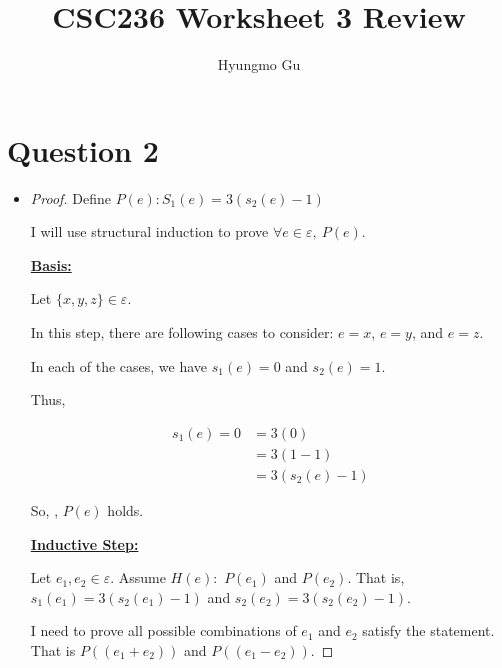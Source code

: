 \documentclass[12pt]{article}
\begin{document}
\title{CSC236 Worksheet 3 Review}
\author{Hyungmo Gu}
\maketitle

\section*{Question 2}
\begin{itemize}
    \item

    \begin{proof}
    Define $P(e):S_1(e) = 3(s_2(e) - 1)$

    \bigskip

    I will use structural induction to prove $\forall e \in \varepsilon,\:P(e)$.

    \bigskip

    \underline{\textbf{Basis:}}

    \bigskip

    Let $\{x,y,z\} \in \varepsilon$.

    \bigskip

    In this step, there are following cases to consider: $e = x$, $e = y$, and $e = z$.

    \bigskip

    In each of the cases, we have $s_1(e) = 0$ and $s_2(e) = 1$.

    \bigskip

    Thus,

    \begin{align}
        s_1(e) = 0 &= 3(0)\\
        &= 3(1-1)\\
        &= 3(s_2(e) - 1)
    \end{align}

    \bigskip

    So, , $P(e)$ holds.

    \bigskip

    \underline{\textbf{Inductive Step:}}

    \bigskip

    Let $e_1, e_2 \in \varepsilon$. Assume $H(e):$ $P(e_1)$ and $P(e_2)$.
    That is, $s_1(e_1) = 3(s_2(e_1) - 1)$ and $s_2(e_2) = 3(s_2(e_2) - 1)$.

    \bigskip

    I need to prove all possible combinations of $e_1$ and $e_2$ satisfy
    the statement. That is $P((e_1 + e_2))$ and $P((e_1 - e_2))$.


\end{proof}
\end{itemize}
\end{document}
